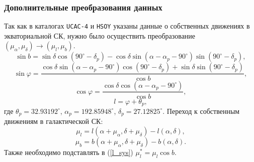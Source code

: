 \documentclass{matmex-diploma-custom}
\begin{document}
\pagebreak
\subsubsection{Дополнительные преобразования данных}
Так как в каталогах \texttt{UCAC-4} и \texttt{HSOY} указаны данные о собственных движениях в экваториальной СК, нужно было осуществить преобразование $(\mu_{\alpha}, \mu_{\delta}) \rightarrow (\mu_l, \mu_b)$.
\begin{equation}
        \sin{b} = \sin{\delta} \cos(90^{\circ} - \delta_p) - \cos{\delta} \sin(\alpha - \alpha_p - 90^{\circ}) \sin(90^{\circ} - \delta_p),
\end{equation}
\begin{equation}
        \sin{\varphi} = \frac{\cos{\delta} \sin(\alpha - \alpha_p - 90^{\circ}) \cos(90^{\circ} - \delta_p) + \sin{\delta} \sin(90^{\circ} - \delta_p)}{\cos{b}},
\end{equation}
\begin{equation}
        \cos{\varphi} = \frac{ \cos{\delta} \cos(\alpha - \alpha_p - 90^{\circ})}{\cos{b}},
\end{equation}
\begin{equation}
        l = \varphi + \theta_p,
\end{equation}
где $\theta_p = 32.93192^{\circ}$, $\alpha_p = 192.85948^{\circ}$, $\delta_p = 27.12825^{\circ}$. Переход к собственным движениям в галактической СК:
\begin{equation}
        \mu_l = l(\alpha + \mu_{\alpha}, \delta + \mu_{\delta}) - l(\alpha, \delta),
\end{equation}
\begin{equation}
        \mu_b = b(\alpha + \mu_{\alpha}, \delta + \mu_{\delta}) - b(\alpha, \delta).
\end{equation}
Также необходимо подставлять в (\ref{l_sys}) $\mu_l^* = \mu_l \cos{b}$.
\end{document}
